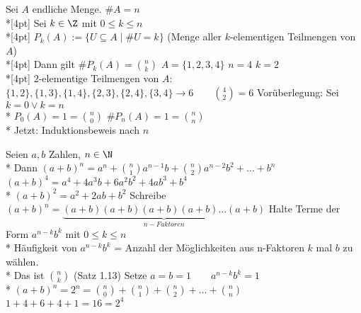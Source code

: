 Sei $A$ endliche Menge. $\#A=n$\\*[4pt]
Sei $k\in\Z$ mit $0\leq k\leq n$\\*[4pt]
$P_k(A):=\{U\subseteq A\mid \#U=k\}$ (Menge aller $k$-elementigen Teilmengen von $A$)\\*[4pt]
Dann gilt $\#P_k(A)=\binom{n}{k}$
\bsp
$A=\{1,2,3,4\}$ $n=4$ $k=2$\\*[4pt]
2-elementige Teilmengen von $A$:
$\{1,2\}, \{1,3\}, \{1,4\}, \{2,3\}, \{2,4\}, \{3,4\} \to 6\qquad \binom{4}{2}=6$ \ok
%
\bew
Vorüberlegung: Sei $k=0 \vee k=n$\\*
$P_0(A)=1=\binom{n}{0}$ $\#P_n(A)=1=\binom{n}{n}$\ok\\*
Jetzt: Induktionsbeweis nach $n$

Seien $a,b$ Zahlen, $n\in\N$\\*
Dann $(a+b)^n=a^n+\binom{n}{1} a^{n-1} b+\binom{n}{2}a^{n-2}b^2+…+b^n$
%
\bsp
$(a+b)^4=a^4+4a^3b+6a^2b^2+4ab^3+b^4$\\*
$(a+b)^2=a^2+2ab+b^2$
%
\bew
Schreibe $(a+b)^n=\underbrace{(a+b)(a+b)(a+b)(a+b)…(a+b)}_{n-Faktoren}$
%
Halte Terme der Form $a^{n-k}b^k$ mit $0\leq k\leq n$\\*
Häufigkeit von $a^{n-k}b^k$ = Anzahl der Möglichkeiten aus n-Faktoren $k$ mal $b$ zu wählen.\\*
Das ist $\binom{n}{k}$ (Satz 1.13)
%
Setze $a=b=1\qquad a^{n-k}b^k=1$\\*
$(a+b)^n=2^n=\binom{n}{0}+\binom{n}{1}+\binom{n}{2}+…+\binom{n}{n}$
%
\bsp
$1+4+6+4+1=16=2^4$

